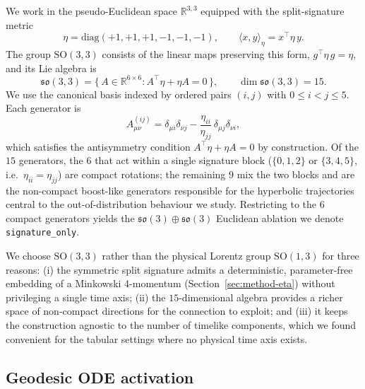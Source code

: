 \documentclass[11pt]{article}
\begin{document}
We work in the pseudo-Euclidean space $\mathbb{R}^{3,3}$ equipped with the
split-signature metric
\begin{equation}
  \eta = \mathrm{diag}(+1,+1,+1,-1,-1,-1),
  \qquad
  \langle x, y\rangle_\eta = x^\top \eta\, y .
\end{equation}
The group $\mathrm{SO}(3,3)$ consists of the linear maps preserving this
form, $g^\top \eta\, g = \eta$, and its Lie algebra is
\begin{equation}
  \mathfrak{so}(3,3) = \{\, A \in \mathbb{R}^{6\times 6} :
    A^\top \eta + \eta A = 0 \,\},
  \qquad \dim \mathfrak{so}(3,3) = 15 .
\end{equation}
We use the canonical basis indexed by ordered pairs $(i,j)$ with
$0 \le i < j \le 5$. Each generator is
\begin{equation}
  A^{(ij)}_{\mu\nu} =
    \delta_{\mu i}\delta_{\nu j}
    - \frac{\eta_{ii}}{\eta_{jj}}\,\delta_{\mu j}\delta_{\nu i},
  \label{eq:generator}
\end{equation}
which satisfies the antisymmetry condition $A^\top\eta + \eta A = 0$ by
construction. Of the $15$ generators, the $6$ that act within a single
signature block ($\{0,1,2\}$ or $\{3,4,5\}$, i.e.\ $\eta_{ii}=\eta_{jj}$)
are compact rotations; the remaining $9$ mix the two blocks and are the
non-compact boost-like generators responsible for the hyperbolic
trajectories central to the out-of-distribution behaviour we study.
Restricting to the $6$ compact generators yields the
$\mathfrak{so}(3)\oplus\mathfrak{so}(3)$ Euclidean ablation we denote
\texttt{signature\_only}.

We choose $\mathrm{SO}(3,3)$ rather than the physical Lorentz group
$\mathrm{SO}(1,3)$ for three reasons: (i) the symmetric split signature
admits a deterministic, parameter-free embedding of a Minkowski
4-momentum (Section~\ref{sec:method-eta}) without privileging a single
time axis; (ii) the $15$-dimensional algebra provides a richer space of
non-compact directions for the connection to exploit; and (iii) it keeps
the construction agnostic to the number of timelike components, which we
found convenient for the tabular settings where no physical time axis
exists.

\subsection{Geodesic ODE activation}
\label{sec:method-act}
\end{document}
